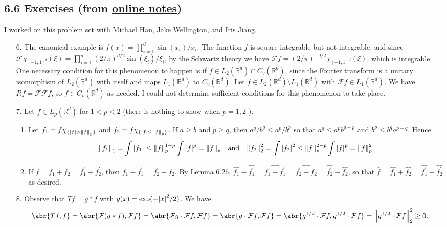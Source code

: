 \documentclass[11pt,leqno]{article}
\theoremstyle{plain}
\theoremstyle{definition}
\numberwithin{equation}{section}
\numberwithin{lem}{section}
\begin{document}
\subsection*{6.6 Exercises (from \href{https://users.oden.utexas.edu/~arbogast/appMath08c.pdf}{online notes})}
I worked on this problem set with Michael Han, Jake Wellington, and Iris Jiang.
\begin{enumerate}
    \item[6.] The canonical example is $f(x) = \prod_{i=1}^d\sin(x_i)/x_i$. The function $f$ is square integrable but not integrable, and since $\mathcal F\chi_{[-1,1]^d}(\xi) = \prod_{i=1}^d(2/\pi)^{d/2}\sin(\xi_i)/\xi_i$, by the Schwartz theory we have $\mathcal Ff = (2/\pi)^{-d/2}\chi_{[-1,1]^d}(\xi)$, which is integrable. One necessary condition for this phenomenon to happen is if $f\in L_2(\mathbb R^d)\cap C_v(\mathbb R^d)$, since the Fourier transform is a unitary isomorphism of $L_2(\mathbb R^d)$ with itself and maps $L_1(\mathbb R^d)$ to $C_v(\mathbb R^d)$. Let $f\in L_2(\mathbb R^d)\setminus L_1(\mathbb R^d)$ with $\mathcal Ff\in L_1(\mathbb R^d)$. We have $Rf = \mathcal F\mathcal Ff$, so $f\in C_v(\mathbb R^d)$ as needed. I could not determine sufficient conditions for this phenomenon to take place.
    \item[7.] Let $f\in L_p(\mathbb R^d)$ for $1 < p < 2$ (there is nothing to show when $p = 1,2$  ). \begin{enumerate}
      \item Let $f_1 = f\chi_{\{\abs{f}>\norm{f}_p\}}$ and $f_2 = f\chi_{\{\abs{f}\leq \norm{f}_p\}}$. If $a\geq b$ and $p\geq q$, then $a^q/b^q\leq a^p/b^p$ so that $a^q\leq a^pb^{q-p}$ and $b^p\leq b^{q}a^{p-q}$. Hence 
      \[\norm{f_1}_1 = \int \abs{f_1}\leq \norm{f}_p^{1-p}\int \abs{f}^p = \norm{f}_p\quad \text{and}\quad \norm{f_2}_2^2 = \int \abs{f_2}^2\leq \norm{f}_p^{2-p}\int\abs{f}^p = \norm{f}_p^2.\]
      \item If $f = f_1 + f_2 = f_1^\prime + f_2^\prime$, then $f_1 - f_1^\prime = f_2^\prime - f_2$. By Lemma 6.26, $\hat{f_1} - \hat{f_1^\prime} = \widehat{f_1 - f_1^\prime} = \widehat{f_2^\prime - f_2} = \hat{f_2^\prime} - \hat{f_2}$, so that $\hat{f} = \hat{f_1} + \hat{f_2} = \hat{f_1^\prime} + \hat{f_2^\prime}$ as desired.
    \end{enumerate}
    \item[8.] Observe that $Tf = g\ast f$ with $g(x)= \exp\relax(-\abs{x}^2/2)$. We have 
    \[\abr{Tf,f} = \abr{\mathcal F(g\ast f),\mathcal Ff} = \abr{\mathcal Fg\cdot \mathcal Ff,\mathcal Ff} = \abr{g\cdot \mathcal Ff,\mathcal Ff} = \abr{g^{1/2}\cdot\mathcal Ff,g^{1/2}\cdot\mathcal Ff} = \norm{g^{1/2}\cdot\mathcal Ff}_2^2\geq 0.\]

\end{enumerate}
\end{document}
